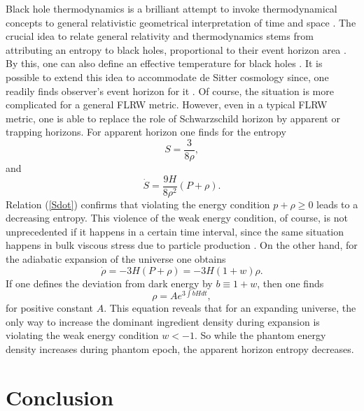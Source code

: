 \documentclass[a4paper,11pt]{article}
\begin{document}
Black hole thermodynamics is a brilliant attempt to invoke thermodynamical concepts to general relativistic geometrical interpretation of time and space \cite{bht}. The crucial idea to relate general relativity and thermodynamics stems from attributing an entropy to black holes, proportional to their event horizon area \cite{thd1,thd2,thd3,thd4}. By this, one can also define an effective temperature for black holes \cite{thd1,thd2,thd3,thd4}. It is possible to extend this idea to accommodate de Sitter cosmology since, one readily finds observer's event horizon for it \cite{thd5}. Of course, the situation is more complicated for a general FLRW metric. However, even in a typical FLRW metric, one is able to replace the role of Schwarzschild horizon by apparent or trapping horizons. For apparent horizon one finds for the entropy \cite{ent}
\begin{equation}
S=\frac{3}{8 \rho},
\label{Sent}
\end{equation}
and 
\begin{equation}
\dot{S}=\frac{9 H}{8 \rho^2}(P+\rho).
\label{Sdot}
\end{equation}
Relation (\ref{Sdot}) confirms that violating the energy condition $p+\rho\geq 0$ leads to a decreasing entropy. This violence of the weak energy condition, of course, is not unprecedented if it happens in a certain time interval, since the same situation happens in bulk viscous stress due to particle production \cite{vis}. On the other hand, for the adiabatic expansion of the universe one obtains \cite{cfp}
\begin{equation}
\dot{\rho}=-3H(P+\rho)=-3H(1+w)\rho.
\end{equation}
If one defines the deviation from dark energy by $b\equiv1+w$, then one finds
\begin{equation}
\rho=A e^{3\int{ b H dt}},
\end{equation}
for positive constant $A$. This equation reveals that for an expanding universe, the only way to increase the dominant ingredient density during expansion is violating the weak energy condition $w<-1$. So while the phantom energy density increases during phantom epoch, the apparent horizon entropy decreases. 
 

 
\section{Conclusion}
\end{document}
